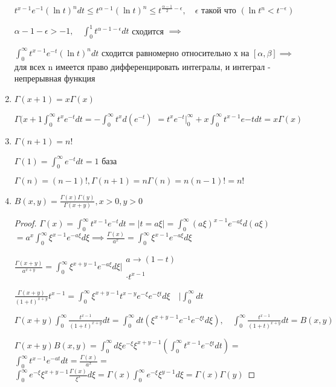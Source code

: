 \documentclass[a4paper, 12pt]{article}
\theoremstyle{definition}
\theoremstyle{remark}
\begin{document}
\begin{enumerate}
     $t^{x-1}e^{-1}(\ln{t})^n dt\leq t^{\alpha -1}(\ln{t})^n \leq t^{\frac{\alpha - 1}{2} - \epsilon}, \quad \epsilon$ такой что $(\ln{t}^n< t^{-\epsilon})$

     $\alpha - 1 - \epsilon > -1, \quad \int_0^1 t^{\alpha - 1 - \epsilon}dt$ сходится $\implies$

     $\int_0^{\infty}t^{x-1}e^{-t}(\ln{t})^n dt$ сходится равномерно относительно х на $[\alpha, \beta]\implies$ для всех n
     имеется право дифференцировать интегралы, и интеграл - непрерывная функция
     \item $\Gamma(x+1)=x\Gamma(x)$
     
     $\Gamma(x+1\int_0^\infty t^x e^{-t}dt = -\int_0^\infty t^x d(e^{-t})$
     $=t^x e^{-t}{\Bigg |}_0^\infty + x\int_0^\infty t^{x-1}e{-t}dt = x\Gamma(x)$

     \item $\Gamma(n+1) = n!$
     
     $\Gamma(1) = \int_0^\infty e^{-t}dt = 1$ база

     $\Gamma(n) = (n-1)!, \Gamma(n+1) = n\Gamma(n) = n(n-1)! = n!$
     \item $B(x,y) = \frac{\Gamma(x)\Gamma(y)}{\Gamma(x+y)}, x>0, y>0$
     \begin{proof}
          $\Gamma(x) = \int_0^\infty t^{x-1}e^{-t}dt = {\Bigg |}t = a\xi{\Bigg |} = \int_0^\infty (a\xi)^{x-1}e^{-a\xi}d(a\xi)$
          $=a^x\int_0^\infty \xi^{x-1}e^{-a\xi}d\xi\implies \frac{\Gamma(x)}{a^x} = \int_0^\infty \xi^{x-1}e^{-a\xi}d\xi$

          $\frac{\Gamma(x+y)}{a^{x+y}} = \int_0^\infty \xi^{x+y-1}e^{-a\xi}d\xi {\Bigg |}\begin{array}{l}
               a\to(1-t)\\
               \\ \cdot t^{x-1}
          \end{array}$

          $\frac{\Gamma(x+y)}{(1+t)^{x+y}}t^{x-1} = \int_0^\infty \xi^{x+y-1}t^{x-y}e^{-\xi}e^{-\xi t}d\xi\quad {\bigg |} \int_0^\infty dt$

          $\Gamma(x+y)\int_0^\infty \frac{t^{x-1}}{(1+t)^{x+y}}dt = \int_0^\infty dt (\xi^{x+y-1}e^{-1}e^{-\xi t}d\xi), \quad \int_0^\infty \frac{t^{x-1}}{(1+t)^{x+y}}dt = B(x,y)$

          $\Gamma(x+y)B(x, y) = \int_0^\infty d\xi e^{-\xi}\xi^{x+y-1}(\int_0^\infty t^{x-1}e^{-\xi t}dt) = $
          $\int_0^\infty t^{x-1}e^{-at}dt = \frac{\Gamma(x)}{a^x} = $
          $\int_0^\infty e^{-\xi} \xi^{x+y-1}\frac{\Gamma(x)}{\xi^x}d\xi = \Gamma(x) \int_0^\infty e^{-\xi}\xi^{y-1}d\xi = \Gamma(x)\Gamma(y)$


\end{proof}
\end{enumerate}
\end{document}
